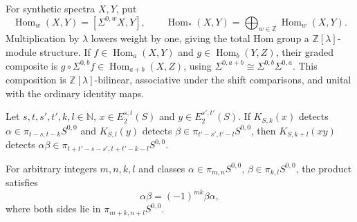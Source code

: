 \begin{definition}
\label{sem:AdamsSynthetic:graded-hom}
For synthetic spectra $X,Y$, put
\[
 \operatorname{Hom}_w(X,Y)=[\Sigma^{0,w}X,Y],\qquad
 \operatorname{Hom}_*(X,Y)=\bigoplus_{w\in\mathbb Z}
       \operatorname{Hom}_w(X,Y).
\]
Multiplication by $\lambda$ lowers weight by one, giving the total
Hom group a $\mathbb Z[\lambda]$-module structure. If
$f\in\operatorname{Hom}_a(X,Y)$ and
$g\in\operatorname{Hom}_b(Y,Z)$, their graded composite is
$g\circ\Sigma^{0,b}f\in\operatorname{Hom}_{a+b}(X,Z)$, using
$\Sigma^{0,a+b}\cong\Sigma^{0,b}\Sigma^{0,a}$.
This composition is $\mathbb Z[\lambda]$-bilinear, associative under
the shift comparisons, and unital with the ordinary identity maps.
\end{definition}

\begin{theorem}
\label{sem:AdamsSynthetic:synthetic-detection-products-exactness}
Let $s,t,s',t',k,l\in\mathbb N$, $x\in E_2^{s,t}(S)$ and
$y\in E_2^{s',t'}(S)$. If $K_{S,k}(x)$ detects
$\alpha\in\pi_{t-s,t-k}S^{0,0}$ and $K_{S,l}(y)$ detects
$\beta\in\pi_{t'-s',t'-l}S^{0,0}$, then $K_{S,k+l}(xy)$ detects
$\alpha\beta\in\pi_{t+t'-s-s',t+t'-k-l}S^{0,0}$.

For arbitrary integers $m,n,k,l$ and classes
$\alpha\in\pi_{m,n}S^{0,0}$, $\beta\in\pi_{k,l}S^{0,0}$, the
product satisfies
\[
 \alpha\beta=(-1)^{mk}\beta\alpha,
\]
where both sides lie in $\pi_{m+k,n+l}S^{0,0}$.
\end{theorem}

